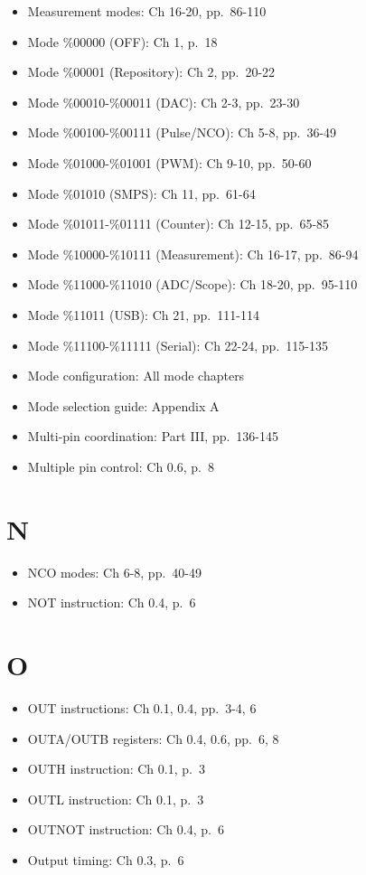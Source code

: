 \documentclass[11pt,a4paper,oneside,english]{book}
\begin{document}
\begin{itemize}
\tightlist
\item
  Measurement modes: Ch 16-20, pp.~86-110
\item
  Mode \%00000 (OFF): Ch 1, p.~18
\item
  Mode \%00001 (Repository): Ch 2, pp.~20-22
\item
  Mode \%00010-\%00011 (DAC): Ch 2-3, pp.~23-30
\item
  Mode \%00100-\%00111 (Pulse/NCO): Ch 5-8, pp.~36-49
\item
  Mode \%01000-\%01001 (PWM): Ch 9-10, pp.~50-60
\item
  Mode \%01010 (SMPS): Ch 11, pp.~61-64
\item
  Mode \%01011-\%01111 (Counter): Ch 12-15, pp.~65-85
\item
  Mode \%10000-\%10111 (Measurement): Ch 16-17, pp.~86-94
\item
  Mode \%11000-\%11010 (ADC/Scope): Ch 18-20, pp.~95-110
\item
  Mode \%11011 (USB): Ch 21, pp.~111-114
\item
  Mode \%11100-\%11111 (Serial): Ch 22-24, pp.~115-135
\item
  Mode configuration: All mode chapters
\item
  Mode selection guide: Appendix A
\item
  Multi-pin coordination: Part III, pp.~136-145
\item
  Multiple pin control: Ch 0.6, p.~8
\end{itemize}

\hypertarget{n}{%
\section{N}\label{n}}

\begin{itemize}
\tightlist
\item
  NCO modes: Ch 6-8, pp.~40-49
\item
  NOT instruction: Ch 0.4, p.~6
\end{itemize}

\hypertarget{o}{%
\section{O}\label{o}}

\begin{itemize}
\tightlist
\item
  OUT instructions: Ch 0.1, 0.4, pp.~3-4, 6
\item
  OUTA/OUTB registers: Ch 0.4, 0.6, pp.~6, 8
\item
  OUTH instruction: Ch 0.1, p.~3
\item
  OUTL instruction: Ch 0.1, p.~3
\item
  OUTNOT instruction: Ch 0.4, p.~6
\item
  Output timing: Ch 0.3, p.~6
\end{itemize}
\end{document}
